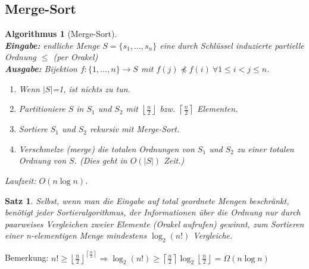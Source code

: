\documentclass[12pt,a4paper]{article}
\theoremstyle{plain}
\newtheorem{Satz}[Theorem]{Satz}
\newtheorem{Algorithmus}[Theorem]{Algorithmus}
\numberwithin{equation}{section}
\begin{document}
\subsection{Merge-Sort}
\begin{Algorithmus}[Merge-Sort]\\
\textbf{Eingabe:} endliche Menge $S=\{s_1,\ldots,s_n\}$ eine durch Schlüssel induzierte partielle Ordnung $\leq$ (per Orakel)\\
\textbf{Ausgabe:} Bijektion $f:\{1,\ldots,n\} \rightarrow S$ mit $f(j)\not\preceq f(i)\ \forall 1\leq i < j\leq n$.
\begin{enumerate}
\item Wenn $|S|$=1, ist nichts zu tun.
\item Partitioniere $S$ in $S_1$ und $S_2$ mit $\left\lfloor\frac{n}{2}\right\rfloor$ bzw. $\left\lceil \frac{n}{2} \right\rceil$ Elementen.
\item Sortiere $S_1$ und $S_2$ rekursiv mit Merge-Sort.
\item Verschmelze (\glqq merge\grqq) die totalen Ordnungen von $S_1$ und $S_2$ zu einer totalen Ordnung von $S$. (Dies geht in $O(|S|)$ Zeit.)
\end{enumerate}
Laufzeit: $O(n \log n)$.
\end{Algorithmus}
\begin{Satz} 
Selbst, wenn man die Eingabe auf total geordnete Mengen beschränkt, benötigt jeder Sortieralgorithmus, der Informationen über die Ordnung nur durch paarweises Vergleichen zweier Elemente (Orakel aufrufen) gewinnt, zum Sortieren einer n-elementigen Menge mindestens $\log_2(n!)$ Vergleiche.
\end{Satz}
Bemerkung: $n!\geq \left\lfloor\frac{n}{2}\right\rfloor^{\left\lceil\frac{n}{2}\right\rceil} \Rightarrow \log_2(n!)\geq \left\lceil\frac{n}{2}\right\rceil \log_2{\left\lfloor\frac{n}{2}\right\rfloor}=\Omega(n\log n)$
\end{document}
